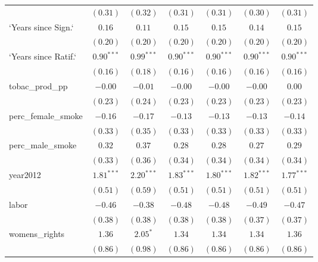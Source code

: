 \begin{table}[!h]
\begin{center}
\begin{tabular}{l c c c c c c }
                        & $(0.31)$     & $(0.32)$     & $(0.31)$     & $(0.31)$     & $(0.30)$     & $(0.31)$     \\
`Years since Sign.`     & $0.16$       & $0.11$       & $0.15$       & $0.15$       & $0.14$       & $0.15$       \\
                        & $(0.20)$     & $(0.20)$     & $(0.20)$     & $(0.20)$     & $(0.20)$     & $(0.20)$     \\
`Years since Ratif.`    & $0.90^{***}$ & $0.99^{***}$ & $0.90^{***}$ & $0.90^{***}$ & $0.90^{***}$ & $0.90^{***}$ \\
                        & $(0.16)$     & $(0.18)$     & $(0.16)$     & $(0.16)$     & $(0.16)$     & $(0.16)$     \\
tobac\_prod\_pp         & $-0.00$      & $-0.01$      & $-0.00$      & $-0.00$      & $-0.00$      & $0.00$       \\
                        & $(0.23)$     & $(0.24)$     & $(0.23)$     & $(0.23)$     & $(0.23)$     & $(0.23)$     \\
perc\_female\_smoke     & $-0.16$      & $-0.17$      & $-0.13$      & $-0.13$      & $-0.13$      & $-0.14$      \\
                        & $(0.33)$     & $(0.35)$     & $(0.33)$     & $(0.33)$     & $(0.33)$     & $(0.33)$     \\
perc\_male\_smoke       & $0.32$       & $0.37$       & $0.28$       & $0.28$       & $0.27$       & $0.29$       \\
                        & $(0.33)$     & $(0.36)$     & $(0.34)$     & $(0.34)$     & $(0.34)$     & $(0.34)$     \\
year2012                & $1.81^{***}$ & $2.20^{***}$ & $1.83^{***}$ & $1.80^{***}$ & $1.82^{***}$ & $1.77^{***}$ \\
                        & $(0.51)$     & $(0.59)$     & $(0.51)$     & $(0.51)$     & $(0.51)$     & $(0.51)$     \\
labor                   & $-0.46$      & $-0.38$      & $-0.48$      & $-0.48$      & $-0.49$      & $-0.47$      \\
                        & $(0.38)$     & $(0.38)$     & $(0.38)$     & $(0.38)$     & $(0.37)$     & $(0.37)$     \\
womens\_rights          & $1.36$       & $2.05^{*}$   & $1.34$       & $1.34$       & $1.34$       & $1.36$       \\
                        & $(0.86)$     & $(0.98)$     & $(0.86)$     & $(0.86)$     & $(0.86)$     & $(0.86)$     \\

\end{tabular}
\end{center}
\end{table}
